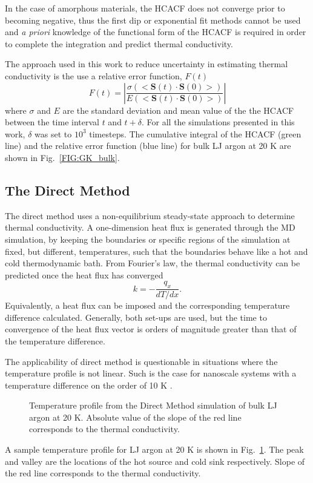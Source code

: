 In the case of amorphous materials, the HCACF does not converge prior to becoming negative, thus the first dip or exponential fit methods cannot be used and \textit{a priori} knowledge of the functional form of the HCACF is required in order to complete the integration and predict thermal conductivity.

The approach used in this work to reduce uncertainty in estimating thermal conductivity is the use a relative error function, $F(t)$ \cite{Chen20102392}
%
\begin{equation}\label{EQ:errfunc}
F(t)= \left\lvert\frac{\sigma(<\bm{S}(t)\cdot\bm{S}(0)>)}{E(<\bm{S}(t)\cdot\bm{S}(0)>)} \right\rvert
\end{equation}
%
where $\sigma$ and $E$ are the standard deviation and mean value of the the HCACF between the time interval $t$ and $t+\delta$. For all the simulations presented in this work, $\delta$ was set to $10^3$ timesteps. The cumulative integral of the HCACF (green line) and the relative error function (blue line) for bulk LJ argon at 20 K are shown in Fig.~\ref{FIG:GK_bulk}.

\subsection{The Direct Method}

The direct method uses a non-equilibrium steady-state approach to determine thermal conductivity. A one-dimension heat flux is generated through the MD simulation, by keeping the boundaries or specific regions of the simulation at fixed, but different, temperatures, such that the boundaries behave like a hot and cold thermodynamic bath. From Fourier's law, the thermal conductivity can be predicted once the heat flux has converged
%
\begin{equation}\label{EQ:DM_k}
k=-\frac{q_x}{dT/dx}.
\end{equation}
%
Equivalently, a heat flux can be imposed and the corresponding temperature difference calculated. Generally, both set-ups are used, but the time to convergence of the heat flux vector is orders of magnitude greater than that of the temperature difference.

The applicability of direct method is questionable in situations where the temperature profile is not linear. Such is the case for nanoscale systems with a temperature difference on the order of 10 K \cite{mcgaugheythesis}.
%
\begin{figure}
\begin{center}
\renewcommand{\figure}{Fig.}
\caption{Temperature profile from the Direct Method simulation of bulk LJ argon at 20 K. Absolute value of the slope of the red line corresponds to the thermal conductivity.}
\label{FIG:DM_bulk}
\end{center}
\end{figure}
%
A sample temperature profile for LJ argon at 20 K is shown in Fig.~\ref{FIG:DM_bulk}. The peak and valley are the locations of the hot source and cold sink respectively. Slope of the red line corresponds to the thermal conductivity.
%
